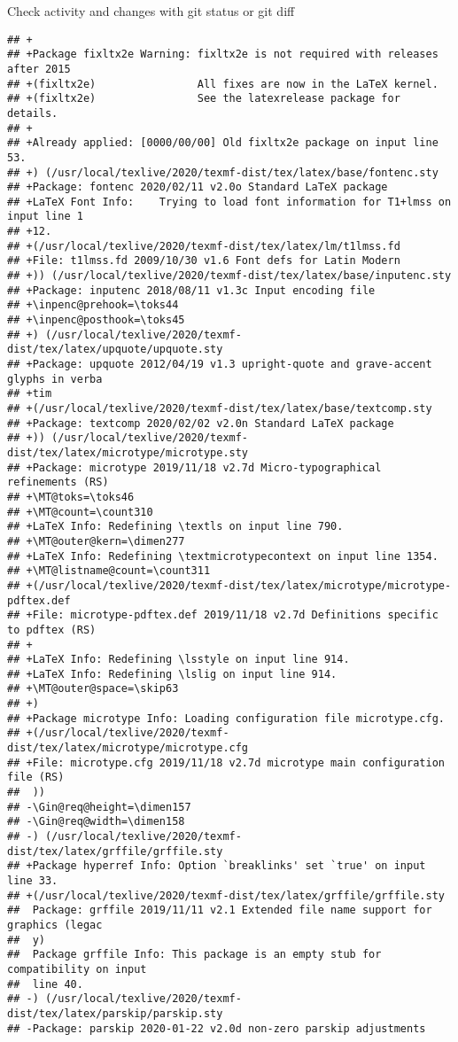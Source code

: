 \documentclass[ignorenonframetext,]{beamer}
\begin{document}
\begin{frame}[fragile]{Check activity and changes with git status or git
diff}
\begin{verbatim}
## +
## +Package fixltx2e Warning: fixltx2e is not required with releases after 2015
## +(fixltx2e)                All fixes are now in the LaTeX kernel.
## +(fixltx2e)                See the latexrelease package for details.
## +
## +Already applied: [0000/00/00] Old fixltx2e package on input line 53.
## +) (/usr/local/texlive/2020/texmf-dist/tex/latex/base/fontenc.sty
## +Package: fontenc 2020/02/11 v2.0o Standard LaTeX package
## +LaTeX Font Info:    Trying to load font information for T1+lmss on input line 1
## +12.
## +(/usr/local/texlive/2020/texmf-dist/tex/latex/lm/t1lmss.fd
## +File: t1lmss.fd 2009/10/30 v1.6 Font defs for Latin Modern
## +)) (/usr/local/texlive/2020/texmf-dist/tex/latex/base/inputenc.sty
## +Package: inputenc 2018/08/11 v1.3c Input encoding file
## +\inpenc@prehook=\toks44
## +\inpenc@posthook=\toks45
## +) (/usr/local/texlive/2020/texmf-dist/tex/latex/upquote/upquote.sty
## +Package: upquote 2012/04/19 v1.3 upright-quote and grave-accent glyphs in verba
## +tim
## +(/usr/local/texlive/2020/texmf-dist/tex/latex/base/textcomp.sty
## +Package: textcomp 2020/02/02 v2.0n Standard LaTeX package
## +)) (/usr/local/texlive/2020/texmf-dist/tex/latex/microtype/microtype.sty
## +Package: microtype 2019/11/18 v2.7d Micro-typographical refinements (RS)
## +\MT@toks=\toks46
## +\MT@count=\count310
## +LaTeX Info: Redefining \textls on input line 790.
## +\MT@outer@kern=\dimen277
## +LaTeX Info: Redefining \textmicrotypecontext on input line 1354.
## +\MT@listname@count=\count311
## +(/usr/local/texlive/2020/texmf-dist/tex/latex/microtype/microtype-pdftex.def
## +File: microtype-pdftex.def 2019/11/18 v2.7d Definitions specific to pdftex (RS)
## +
## +LaTeX Info: Redefining \lsstyle on input line 914.
## +LaTeX Info: Redefining \lslig on input line 914.
## +\MT@outer@space=\skip63
## +)
## +Package microtype Info: Loading configuration file microtype.cfg.
## +(/usr/local/texlive/2020/texmf-dist/tex/latex/microtype/microtype.cfg
## +File: microtype.cfg 2019/11/18 v2.7d microtype main configuration file (RS)
##  ))
## -\Gin@req@height=\dimen157
## -\Gin@req@width=\dimen158
## -) (/usr/local/texlive/2020/texmf-dist/tex/latex/grffile/grffile.sty
## +Package hyperref Info: Option `breaklinks' set `true' on input line 33.
## +(/usr/local/texlive/2020/texmf-dist/tex/latex/grffile/grffile.sty
##  Package: grffile 2019/11/11 v2.1 Extended file name support for graphics (legac
##  y)
##  Package grffile Info: This package is an empty stub for compatibility on input 
##  line 40.
## -) (/usr/local/texlive/2020/texmf-dist/tex/latex/parskip/parskip.sty
## -Package: parskip 2020-01-22 v2.0d non-zero parskip adjustments

\end{verbatim}
\end{frame}
\end{document}
